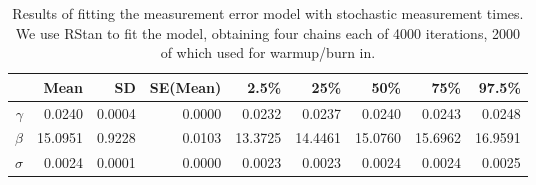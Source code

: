 \documentclass{article}
\begin{document}
\begin{table}[ht]
\centering
\begin{tabular}{rrrrrrrrr}
  \hline
 & Mean & SD & SE(Mean) & 2.5\% & 25\% & 50\% & 75\% & 97.5\% \\ 
  \hline
$\gamma$ & 0.0240 & 0.0004 & 0.0000 & 0.0232 & 0.0237 & 0.0240 & 0.0243 & 0.0248 \\ 
  $\beta$ & 15.0951 & 0.9228 & 0.0103 & 13.3725 & 14.4461 & 15.0760 & 15.6962 & 16.9591 \\ 
  $\sigma$ & 0.0024 & 0.0001 & 0.0000 & 0.0023 & 0.0023 & 0.0024 & 0.0024 & 0.0025 \\ 
   \hline
\end{tabular}
 \caption{Results of fitting the measurement error model with stochastic measurement times. We use RStan \citep{rstan-software:2015,stan-software:2015} to fit the model, obtaining four chains each of 4000 iterations, 2000 of which used for warmup/burn in.}
 \label{tab:modelfit}
\end{table}

\end{document}
